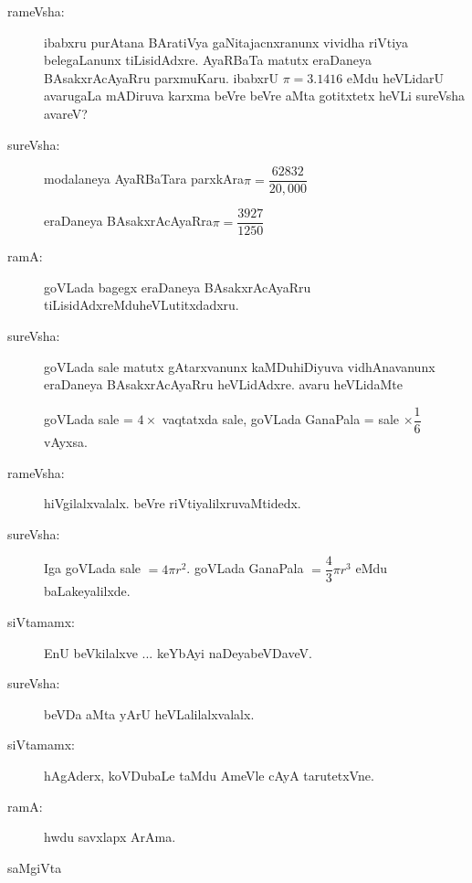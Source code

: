 \begin{description}
\item[rameVsha:] ibabxru purAtana BAratiVya gaNitajacnxranunx vividha riVtiya belegaLanunx tiLisidAdxre. AyaRBaTa matutx eraDaneya BAsakxrAcAyaRru parxmuKaru. ibabxrU $\pi =3.1416$ eMdu heVLidarU avarugaLa mADiruva karxma beVre beVre aMta gotitxtetx heVLi sureVsha avareV?

\item[sureVsha:] modalaneya AyaRBaTara parxkAra\quad $\pi=\dfrac{62832}{20,000}$

eraDaneya BAsakxrAcAyaRra\quad $\pi=\dfrac{3927}{1250}$

\item[ramA:] goVLada bagegx eraDaneya BAsakxrAcAyaRru tiLisidAdxreMdu\break heVLutitxdadxru.

\item[sureVsha:] goVLada sale matutx gAtarxvanunx kaMDuhiDiyuva vidhAnavanunx eraDaneya BAsakxrAcAyaRru heVLidAdxre. avaru heVLidaMte 

goVLada sale = $4\times{}$ vaqtatxda sale, goVLada GanaPala = sale $\times\dfrac{1}{6}$ vAyxsa.

\item[rameVsha:] hiVgilalxvalalx. beVre riVtiyalilxruvaMtidedx.

\item[sureVsha:] Iga goVLada sale $=4\pi r^{2}$. goVLada GanaPala $=\dfrac{4}{3}\pi r^{3}$ eMdu baLakeyalilxde.

\item[siVtamamx:] EnU beVkilalxve ... keYbAyi naDeyabeVDaveV.

\item[sureVsha:] beVDa aMta yArU heVLalilalxvalalx.

\item[siVtamamx:] hAgAderx, koVDubaLe taMdu AmeVle cAyA tarutetxVne.

\item[ramA:] hwdu savxlapx ArAma.
\end{description}
\centerline{saMgiVta}
